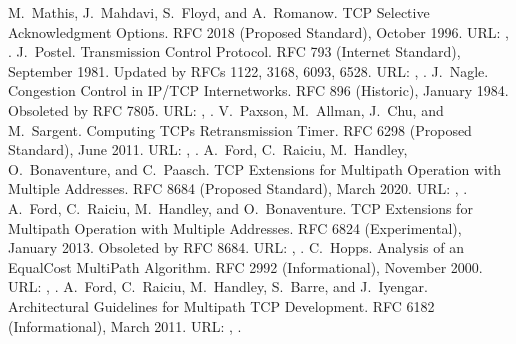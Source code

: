 \documentclass[letterpaper,10pt,english]{sphinxmanual}
\begin{document}
\begin{sphinxthebibliography}{10}
\sphinxAtStartPar
M. Mathis, J. Mahdavi, S. Floyd, and A. Romanow. TCP Selective Acknowledgment Options. RFC 2018 (Proposed Standard), October 1996. URL: , .
\sphinxAtStartPar
J. Postel. Transmission Control Protocol. RFC 793 (Internet Standard), September 1981. Updated by RFCs 1122, 3168, 6093, 6528. URL: , .
\sphinxAtStartPar
J. Nagle. Congestion Control in IP/TCP Internetworks. RFC 896 (Historic), January 1984. Obsoleted by RFC 7805. URL: , .
\sphinxAtStartPar
V. Paxson, M. Allman, J. Chu, and M. Sargent. Computing TCP\textquotesingle{}s Retransmission Timer. RFC 6298 (Proposed Standard), June 2011. URL: , .
\sphinxAtStartPar
A. Ford, C. Raiciu, M. Handley, O. Bonaventure, and C. Paasch. TCP Extensions for Multipath Operation with Multiple Addresses. RFC 8684 (Proposed Standard), March 2020. URL: , .
\sphinxAtStartPar
A. Ford, C. Raiciu, M. Handley, and O. Bonaventure. TCP Extensions for Multipath Operation with Multiple Addresses. RFC 6824 (Experimental), January 2013. Obsoleted by RFC 8684. URL: , .
\sphinxAtStartPar
C. Hopps. Analysis of an Equal\sphinxhyphen{}Cost Multi\sphinxhyphen{}Path Algorithm. RFC 2992 (Informational), November 2000. URL: , .
\sphinxAtStartPar
A. Ford, C. Raiciu, M. Handley, S. Barre, and J. Iyengar. Architectural Guidelines for Multipath TCP Development. RFC 6182 (Informational), March 2011. URL: , .

\end{sphinxthebibliography}
\end{document}
